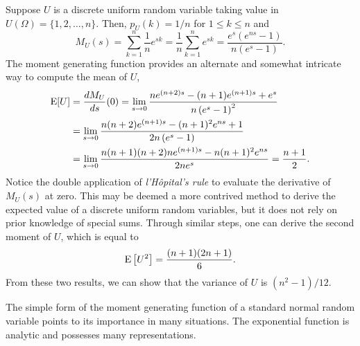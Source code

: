 \begin{example}
Suppose $U$ is a discrete uniform random variable taking value in $U(\Omega) = \{ 1, 2, \ldots, n \}$.
Then, $p_U(k) = 1/n$ for $1 \leq k \leq n$ and
\begin{equation*}
M_U(s) = \sum_{k = 1}^n \frac{1}{n} e^{sk}
= \frac{1}{n} \sum_{k = 1}^n e^{sk}
= \frac {e^s (e^{ns} - 1)} {n (e^s - 1)} .
\end{equation*}
The moment generating function provides an alternate and somewhat intricate way to compute the mean of $U$,
\begin{equation*}
\begin{split}
\mathrm{E} [U] &= \frac{d M_U}{ds} (0)
= \lim_{s \rightarrow 0}
\frac{n e^{(n+2)s} - (n+1) e^{(n+1)s} + e^s}{n \left( e^s - 1 \right)^2} \\
&= \lim_{s \rightarrow 0}
\frac{n(n+2) e^{(n+1)s} - (n+1)^2 e^{ns} + 1}{2n \left( e^s - 1 \right)} \\
&= \lim_{s \rightarrow 0}
\frac{n(n+1)(n+2)n e^{(n+1)s} - n (n+1)^2 e^{ns}}{2n e^s}
= \frac {n + 1}{2} .
\end{split}
\end{equation*}
Notice the double application of \emph{l'H\^{o}pital's rule} to evaluate the derivative of $M_U(s)$ at zero.
This may be deemed a more contrived method to derive the expected value of a discrete uniform random variables, but it does not rely on prior knowledge of special sums.
Through similar steps, one can derive the second moment of $U$, which is equal to
\begin{equation*}
\mathrm{E} \left[ U^2 \right] = \frac{(n+1)(2n+1)}{6} .
\end{equation*}
From these two results, we can show that the variance of $U$ is $(n^2 - 1)/12$.
\end{example}

The simple form of the moment generating function of a standard normal random variable points to its importance in many situations.
The exponential function is analytic and possesses many representations.

